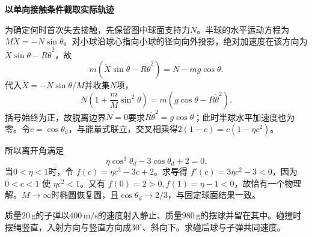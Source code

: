 \begin{solution}
\par\medskip{}\noindent\textbf{以单向接触条件截取实际轨迹}\par\nobreak
为确定何时首次失去接触，先保留图中球面支持力$N$。半球的水平运动方程为$M\ddot X=-N\sin\theta$。对小球沿球心指向小球的径向向外投影，绝对加速度在该方向为$\ddot X\sin\theta-R\dot\theta^2$，故
\[
m(\ddot X\sin\theta-R\dot\theta^2)=N-mg\cos\theta.
\]
代入$\ddot X=-N\sin\theta/M$并收集$N$项，
\[
N\left(1+\frac mM\sin^2\theta\right)
=m(g\cos\theta-R\dot\theta^2).
\]
括号始终为正，故脱离边界$N=0$要求$R\dot\theta^2=g\cos\theta$；此时半球水平加速度也为零。令$c=\cos\theta_d$，与能量式联立，交叉相乘得$2(1-c)=c(1-\eta c^2)$。


所以离开角满足
\[\eta\cos^3\theta_d-3\cos\theta_d+2=0.\]
当$0<\eta<1$时，令 $f(c)=\eta c^3-3c+2$。求导得 $f'(c)=3\eta c^2-3<0$，因为 $0<c<1$ 使 $\eta c^2<1$。又有 $f(0)=2>0,f(1)=\eta-1<0$，故恰有一个物理解。$M\to\infty$时椭圆恢复圆，且$\cos\theta_d\to2/3$，与固定球面结果一致。\end{solution}
\begin{question}\begin{example}[斜射入摆球的子弹]\label{em2:example:12}
质量$20\,\mathrm g$的子弹以$400\,\mathrm{m/s}$的速度射入静止、质量$980\,\mathrm g$的摆球并留在其中。碰撞时摆绳竖直，入射方向与竖直方向成$30^\circ$、斜向下。求碰后球与子弹共同速度。
\end{example}
\end{question}
